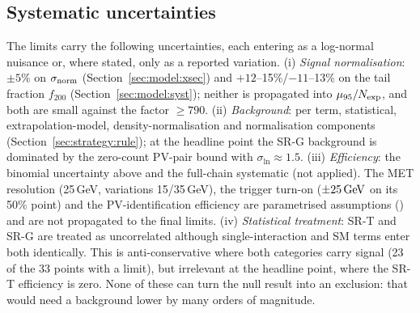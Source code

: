 \subsection{Systematic uncertainties}\label{sec:results:syst}
The limits carry the following uncertainties, each entering as a log-normal nuisance or, where stated, only as a
reported variation. (i) \emph{Signal normalisation}: $\pm5\%$ on $\sigma_{\rm norm}$ (Section~\ref{sec:model:xsec}) and
$+12$--15\%/$-11$--13\% on the tail fraction $f_{200}$ (Section~\ref{sec:model:syst}); neither is propagated into
$\mu_{95}/N_{\rm exp}$, and both are small against the factor $\ge790$.
(ii) \emph{Background}: per term, statistical, extrapolation-model, density-normalisation and normalisation components
(Section~\ref{sec:strategy:rule}); at the headline point the SR-G background is dominated by the zero-count PV-pair bound with
$\sigma_{\ln}\approx1.5$. (iii) \emph{Efficiency}: the binomial uncertainty above and the full-chain systematic (not
applied). The MET resolution (25\,GeV, variations 15/35\,GeV), the trigger turn-on ($\pm25\,\mathrm{GeV}$ on its 50\% point) and
the PV-identification efficiency are parametrised assumptions (\UNV{}) and are not propagated to the final limits.
(iv) \emph{Statistical treatment}: SR-T and SR-G are treated as uncorrelated although single-interaction and SM terms
enter both identically. This is anti-conservative where both categories carry signal (23 of the 33 points with a limit),
but irrelevant at the headline point, where the SR-T efficiency is zero. None of these can
turn the null result into an exclusion: that would need a background lower by many orders of magnitude.
